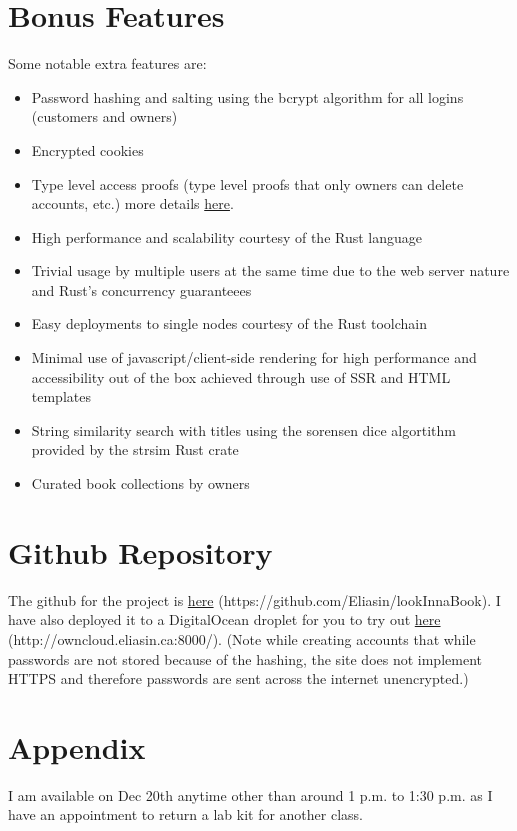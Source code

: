\documentclass{article}
\begin{document}
\section{Bonus Features}
Some notable extra features are:
\begin{itemize}
  \item Password hashing and salting using the bcrypt algorithm for all logins (customers and owners)
  \item Encrypted cookies
  \item Type level access proofs (type level proofs that only owners can delete accounts, etc.) more details \href{https://rocket.rs/v0.4/guide/requests/#custom-guards}{here}.
  \item High performance and scalability courtesy of the Rust language
  \item Trivial usage by multiple users at the same time due to the web server nature and Rust's concurrency guaranteees
  \item Easy deployments to single nodes courtesy of the Rust toolchain
  \item Minimal use of javascript/client-side rendering for high performance and accessibility out of the box achieved through use of SSR and HTML templates
  \item String similarity search with titles using the sorensen dice algortithm provided by the strsim Rust crate
  \item Curated book collections by owners
\end{itemize}


\section{Github Repository}
The github for the project is \href{https://github.com/Eliasin/lookInnaBook}{here} (https://github.com/Eliasin/lookInnaBook). I have also deployed it to a DigitalOcean droplet for you to try out \href{http://owncloud.eliasin.ca:8000/}{here} (http://owncloud.eliasin.ca:8000/). (Note while creating accounts that while passwords are not stored because of the hashing, the site does not implement HTTPS and therefore passwords are sent across the internet unencrypted.)

\section{Appendix}
I am available on Dec 20th anytime other than around 1 p.m. to 1:30 p.m. as I have an appointment to return a lab kit for another class.
\end{document}
